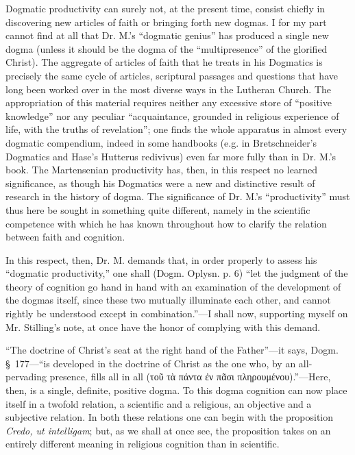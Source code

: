 \documentclass[12pt,a4paper,openany]{book}
\newcommand{\opage}[1]{\marginnote{\footnotesize\textit{[#1]}}}
\begin{document}
Dogmatic productivity can surely not, at the present time,
consist chiefly in discovering new articles of faith
or bringing forth new dogmas. I for my part
cannot find at all that Dr. M.'s ``dogmatic genius''
\setcounter{footnote}{0}%
\opage{33}has produced a single new dogma (unless it should
be the dogma of the ``multipresence'' of the glorified Christ).
The aggregate of articles of faith that he treats
in his Dogmatics is precisely the same cycle of
articles, scriptural passages and questions that have long been worked over
in the most diverse ways in the Lutheran Church.
The appropriation of this material requires neither any excessive
store of ``positive knowledge'' nor any peculiar
``acquaintance, grounded in religious experience of life, with the truths of
revelation''; one finds the whole apparatus in almost
every dogmatic compendium, indeed in some handbooks (e.g.
in Bretschneider's Dogmatics and Hase's Hutterus redivivus)
even far more fully than in Dr. M.'s book. The
Martensenian productivity has, then, in this respect no learned
significance, as though his Dogmatics were a new and distinctive
result of research in the history of dogma. The significance
of Dr. M.'s ``productivity'' must thus here be sought in
something quite different, namely in the scientific competence
with which he has known throughout how to clarify the relation
between faith and cognition.

In this respect, then, Dr. M. demands that, in order
properly to assess his ``dogmatic productivity,'' one shall (Dogm.
Oplysn. p. 6) ``let the judgment of the theory of cognition go
hand in hand with an examination of the development of the dogmas itself,
since these two mutually illuminate each other, and
cannot rightly be understood except in combination.''---I shall
now, supporting myself on Mr. Stilling's note, at once
have the honor of complying with this demand.

``The doctrine of Christ's seat at the right hand of the Father''---it says,
Dogm. §~177---``is developed in the doctrine of Christ
\setcounter{footnote}{0}%
\opage{34}as the one who, by an all-pervading presence, fills
all in all (τοῦ τὰ πάντα ἐν πᾶσι πληρουμένου).''---Here,
then, is a single, definite, positive dogma. To this dogma
cognition can now place itself in a twofold relation, a scientific
and a religious, an objective and a subjective relation.
In both these relations one can begin with the proposition
\textit{Credo, ut intelligam}; but, as we shall at once see, the
proposition takes on an entirely different meaning in religious cognition
than in scientific.
\end{document}

